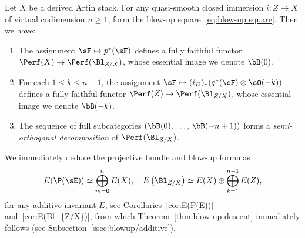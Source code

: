 \begin{thmX}\label{thm:Perf(Bl)}
Let $X$ be a derived Artin stack. For any quasi-smooth closed immersion $i : Z \to X$ of virtual codimension $n\ge 1$, form the blow-up square~\eqref{eq:blow-up square}. Then we have:
\begin{enumerate}\romanenumi
\item\label{item:Perf(Bl)/fully faithful 1}
The assignment $\sF \mapsto p^*(\sF)$ defines a fully faithful functor $\Perf(X) \linebreak\to \Perf(\Bl_{Z/X})$, whose essential image we denote $\bB(0)$.

\item\label{item:Perf(Bl)/fully faithful 2}
For each $1\le k\le n-1$, the assignment $\sF \mapsto (i_D)_*(q^*(\sF) \otimes \sO(-k))$ defines a fully faithful functor $\Perf(Z) \to \Perf(\Bl_{Z/X})$, whose essential image we denote $\bB(-k)$.

\item\label{item:Perf(Bl)/SOD}
The sequence of full subcategories $(\bB(0),\,\ldots,\,\bB(-n+1))$ forms a \emph{semi-orthogonal decomposition} of $\Perf(\Bl_{Z/X})$.
\end{enumerate}
\end{thmX}

We immediately deduce the projective bundle and blow-up formulas
\[
E(\P(\sE)) \simeq \bigoplus_{m=0}^{n} E(X),
\quad E\left(\Bl_{Z/X}\right) \simeq E(X) \oplus \bigoplus_{k=1}^{n-1} E(Z),
\]
for any additive invariant $E$, see Corollaries~\ref{cor:E(P(E))} and~\ref{cor:E(Bl_{Z/X})}, from which Theorem~\ref{thm:blow-up descent} immediately follows (see Subsection~\ref{ssec:blowup/additive}).

